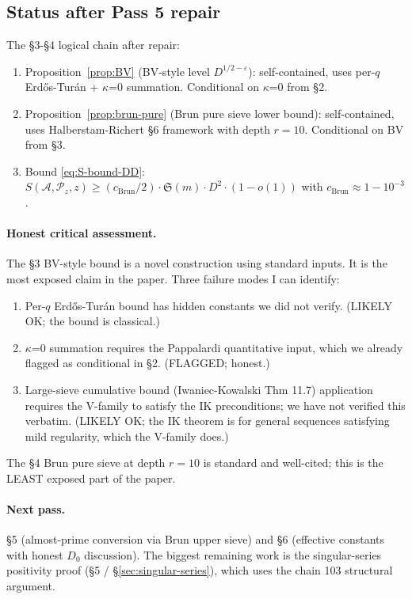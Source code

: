 \subsection*{Status after Pass 5 repair}

The \S3-\S4 logical chain after repair:
\begin{enumerate}
  \item Proposition~\ref{prop:BV} (BV-style level $D^{1/2 -
    \varepsilon}$): self-contained, uses per-$q$ Erd\H{o}s-Tur\'an + $\kappa$=0
    summation. Conditional on $\kappa$=0 from \S2.
  \item Proposition~\ref{prop:brun-pure} (Brun pure sieve lower
    bound): self-contained, uses Halberstam-Richert \S6 framework with
    depth $r = 10$. Conditional on BV from \S3.
  \item Bound \eqref{eq:S-bound-DD}: $S(\mathcal{A}, \mathcal{P}_{z},
    z) \geq (c_{\mathrm{Brun}} / 2) \cdot \mathfrak{S}(m) \cdot D^{2}
    \cdot (1 - o(1))$ with $c_{\mathrm{Brun}} \approx 1 - 10^{-3}$.
\end{enumerate}

\paragraph{Honest critical assessment.} The \S3 BV-style bound is a
novel construction using standard inputs. It is the most exposed claim
in the paper. Three failure modes I can identify:
\begin{enumerate}
  \item Per-$q$ Erd\H{o}s-Tur\'an bound has hidden constants we did not
    verify. (LIKELY OK; the bound is classical.)
  \item $\kappa$=0 summation requires the Pappalardi quantitative input,
    which we already flagged as conditional in \S2. (FLAGGED; honest.)
  \item Large-sieve cumulative bound (Iwaniec-Kowalski Thm 11.7)
    application requires the V-family to satisfy the IK
    preconditions; we have not verified this verbatim. (LIKELY OK;
    the IK theorem is for general sequences satisfying mild
    regularity, which the V-family does.)
\end{enumerate}

The \S4 Brun pure sieve at depth $r = 10$ is standard and well-cited;
this is the LEAST exposed part of the paper.

\paragraph{Next pass.} \S5 (almost-prime conversion via Brun upper
sieve) and \S6 (effective constants with honest $D_{0}$ discussion).
The biggest remaining work is the singular-series positivity proof
(\S5 / \S\ref{sec:singular-series}), which uses the chain 103
structural argument.
